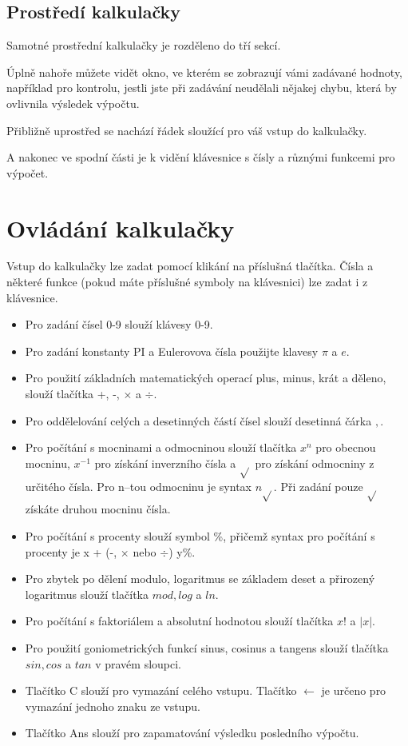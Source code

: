 \documentclass[12pt]{article}
\begin{document}
\subsection{Prostředí kalkulačky}
Samotné prostřední kalkulačky je rozděleno do tří sekcí.

Úplně nahoře můžete vidět okno, ve kterém se zobrazují vámi zadávané hodnoty, například pro kontrolu, jestli jste při zadávání neudělali nějakej chybu, která by ovlivnila výsledek výpočtu.

Přibližně uprostřed se nachází řádek sloužící pro váš vstup do kalkulačky.

A nakonec ve spodní části je k vidění klávesnice s čísly a různými funkcemi pro výpočet.

\section{Ovládání kalkulačky}
Vstup do kalkulačky lze zadat pomocí klikání na příslušná tlačítka. Čísla a některé funkce (pokud máte příslušné symboly na klávesnici) lze zadat i z klávesnice.
\begin{itemize}
\item Pro zadání čísel 0-9 slouží klávesy 0-9.
\item Pro zadání konstanty PI a Eulerovova čísla použijte klavesy $\pi$ a $e$.
\item Pro použití základních matematických operací plus, minus, krát a děleno, slouží tlačítka +, -, $\times$ a $\div$.
\item Pro oddělelování celých a desetinných částí čísel slouží desetinná čárka $,$.
\item Pro počítání s mocninami a odmocninou slouží tlačítka $x^n$ pro obecnou mocninu, $x^{-1}$ pro získání inverzního čísla a $\sqrt{}$ pro získání odmocniny z určitého čísla. Pro n--tou odmocninu je syntax $n\sqrt{}$. Při zadání pouze $\sqrt{}$ získáte druhou mocninu čísla.
\item Pro počítání s procenty slouží symbol \%, přičemž syntax pro počítání s procenty je x +  (-, $\times$ nebo $\div$) y\%.
\item Pro zbytek po dělení modulo, logaritmus se základem deset a přirozený logaritmus slouží tlačítka $mod, log$ a $ln$.
\item Pro počítání s faktoriálem a absolutní hodnotou slouží tlačítka $x!$ a $|x|$.
\item Pro použití goniometrických funkcí sinus, cosinus a tangens slouží tlačítka $sin, cos$ a $tan$ v pravém sloupci.
\item Tlačítko C slouží pro vymazání celého vstupu. Tlačítko $\longleftarrow$ je určeno pro vymazání jednoho znaku ze vstupu.
\item Tlačítko Ans slouží pro zapamatování výsledku posledního výpočtu.
\end{itemize}
\end{document}
